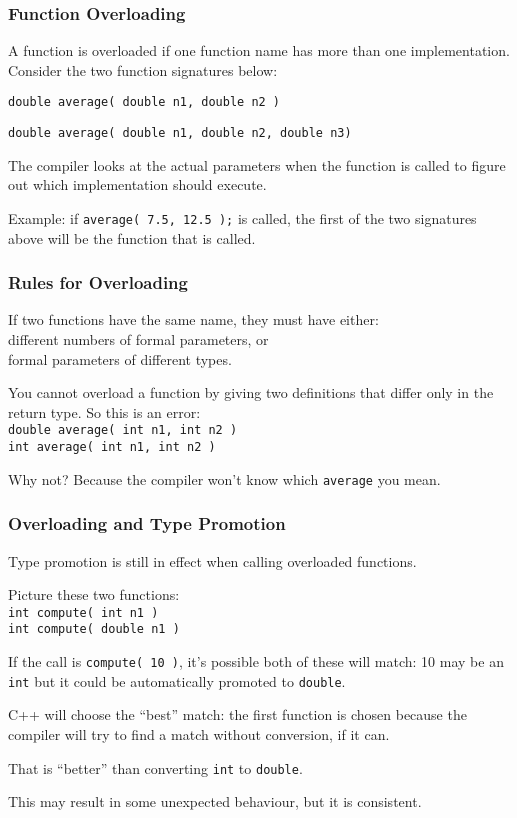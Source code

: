 \begin{frame}
\frametitle{Function Overloading}

A function is \alert{overloaded} if one function name has more than one implementation. Consider the two function signatures below:

\texttt{double average( double n1, double n2 )}

\texttt{double average( double n1, double n2, double n3) }

The compiler looks at the actual parameters when the function is called to figure out which implementation should execute.

Example: if \texttt{average( 7.5, 12.5 );} is called, the first of the two signatures above will be the function that is called.

\end{frame}

\begin{frame}
\frametitle{Rules for Overloading}

If two functions have the same name, they must have either:\\
\quad different numbers of formal parameters, or\\
\quad formal parameters of different types.

You cannot overload a function by giving two definitions that differ only in the return type. So this is an error:\\
\texttt{double average( int n1, int n2 )}\\
\texttt{int average( int n1, int n2 )}

Why not? Because the compiler won't know which \texttt{average} you mean.

\end{frame}

\begin{frame}
\frametitle{Overloading and Type Promotion}

Type promotion is still in effect when calling overloaded functions.

Picture these two functions:\\
\texttt{int compute( int n1 )}\\
\texttt{int compute( double n1 )}

If the call is \texttt{compute( 10 )}, it's possible both of these will match: 10 may be an \texttt{int} but it could be automatically promoted to \texttt{double}.

C++ will choose the ``best'' match: the first function is chosen because 
the compiler will try to find a match without conversion, if it can.

That is ``better'' than converting \texttt{int} to \texttt{double}.

This may result in some unexpected behaviour, but it is consistent.

\end{frame}


